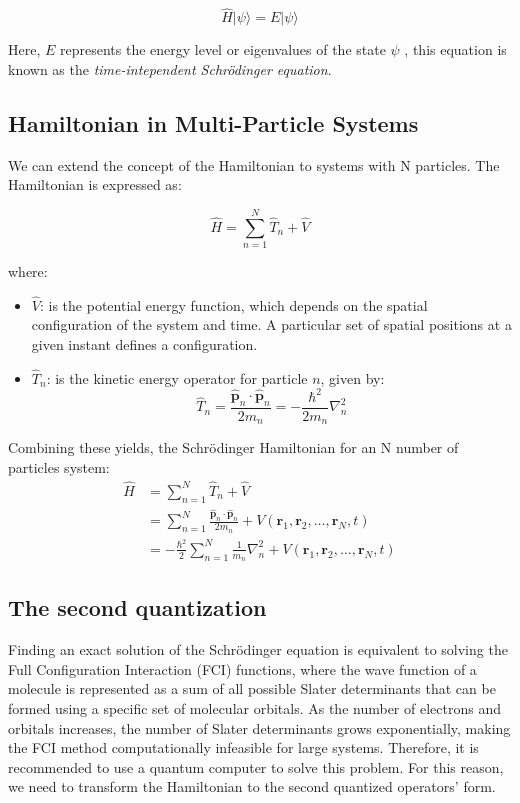 \[
\hat{H} |\psi\rangle = E |\psi\rangle
\]

Here, \( E \) represents the energy level or eigenvalues of the state $\psi$ , this equation is known as the \textit{time-intependent Schrödinger equation}.\cite{tao_schrodinger}

\subsection{Hamiltonian in Multi-Particle Systems}

We can extend the concept of the Hamiltonian to systems with N particles.\cite{wiki:hamiltonian_quantum_mechanics} The Hamiltonian is expressed as:

\[
\hat{H} = \sum_{n=1}^{N} \hat{T}_{n} + \hat{V}
\]

where:
\begin{itemize}
    \item \(\hat{V}\): is the potential energy function, which depends on the spatial configuration of the system and time. A particular set of spatial positions at a given instant defines a configuration.
    \item \(\hat{T}_{n}\): is the kinetic energy operator for particle \(n\), given by:
    \[
    \hat{T}_{n} = \frac{\mathbf{\hat{p}}_{n} \cdot \mathbf{\hat{p}}_{n}}{2m_{n}} = -\frac{\hbar^2}{2m_{n}} \nabla_{n}^2
    \]
\end{itemize}

Combining these yields, the Schrödinger Hamiltonian for an N number of particles system:
\[
\begin{aligned}
\hat{H} &= \sum_{n=1}^{N} \hat{T}_{n} + \hat{V} \\[6pt]
        &= \sum_{n=1}^{N} \frac{\mathbf{\hat{p}}_{n} \cdot \mathbf{\hat{p}}_{n}}{2m_{n}} + V(\mathbf{r}_{1}, \mathbf{r}_{2}, \ldots, \mathbf{r}_{N}, t) \\[6pt]
        &= -\frac{\hbar^2}{2} \sum_{n=1}^{N} \frac{1}{m_{n}} \nabla_{n}^2 + V(\mathbf{r}_{1}, \mathbf{r}_{2}, \ldots, \mathbf{r}_{N}, t)
\end{aligned}
\]
\subsection{The second quantization}

Finding an exact solution of the  Schrödinger equation is equivalent to solving the Full Configuration Interaction (FCI) functions, where the wave function of a molecule is represented as a sum of all possible Slater determinants that can be formed using a specific set of molecular orbitals. As the number of electrons and orbitals increases, the number of Slater determinants grows exponentially, making the FCI method computationally infeasible for large systems. Therefore, it is recommended to use a quantum computer to solve this problem. For this reason, we need to transform the Hamiltonian to the second quantized operators' form.

